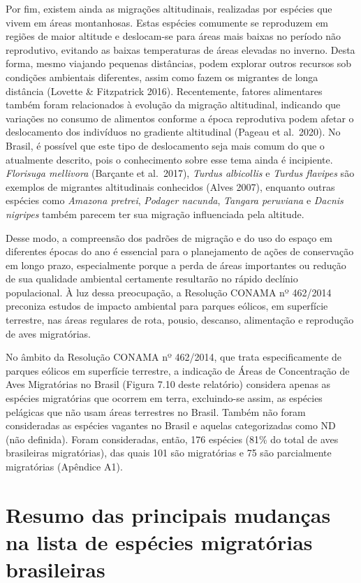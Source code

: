 \documentclass[
  oneside]{scrbook}
\begin{document}
Por fim, existem ainda as migrações altitudinais, realizadas por espécies que vivem em áreas montanhosas. Estas espécies comumente se reproduzem em regiões de maior altitude e deslocam-se para áreas mais baixas no período não reprodutivo, evitando as baixas temperaturas de áreas elevadas no inverno. Desta forma, mesmo viajando pequenas distâncias, podem explorar outros recursos sob condições ambientais diferentes, assim como fazem os migrantes de longa distância (Lovette \& Fitzpatrick 2016). Recentemente, fatores alimentares também foram relacionados à evolução da migração altitudinal, indicando que variações no consumo de alimentos conforme a época reprodutiva podem afetar o deslocamento dos indivíduos no gradiente altitudinal (Pageau et al.~2020). No Brasil, é possível que este tipo de deslocamento seja mais comum do que o atualmente descrito, pois o conhecimento sobre esse tema ainda é incipiente. \emph{Florisuga mellivora} (Barçante et al.~2017), \emph{Turdus albicollis} e \emph{Turdus flavipes} são exemplos de migrantes altitudinais conhecidos (Alves 2007), enquanto outras espécies como \emph{Amazona pretrei}, \emph{Podager nacunda}, \emph{Tangara peruviana} e \emph{Dacnis nigripes} também parecem ter sua migração influenciada pela altitude.

Desse modo, a compreensão dos padrões de migração e do uso do espaço em diferentes épocas do ano é essencial para o planejamento de ações de conservação em longo prazo, especialmente porque a perda de áreas importantes ou redução de sua qualidade ambiental certamente resultarão no rápido declínio populacional. À luz dessa preocupação, a Resolução CONAMA nº 462/2014 preconiza estudos de impacto ambiental para parques eólicos, em superfície terrestre, nas áreas regulares de rota, pousio, descanso, alimentação e reprodução de aves migratórias.

No âmbito da Resolução CONAMA nº 462/2014, que trata especificamente de parques eólicos em superfície terrestre, a indicação de Áreas de Concentração de Aves Migratórias no Brasil (Figura 7.10 deste relatório) considera apenas as espécies migratórias que ocorrem em terra, excluindo-se assim, as espécies pelágicas que não usam áreas terrestres no Brasil. Também não foram consideradas as espécies vagantes no Brasil e aquelas categorizadas como ND (não definida). Foram consideradas, então, 176 espécies (81\% do total de aves brasileiras migratórias), das quais 101 são migratórias e 75 são parcialmente migratórias (Apêndice A1).

\hypertarget{resumo-das-principais-mudanuxe7as-na-lista-de-espuxe9cies-migratuxf3rias-brasileiras}{%
\section{Resumo das principais mudanças na lista de espécies migratórias brasileiras}\label{resumo-das-principais-mudanuxe7as-na-lista-de-espuxe9cies-migratuxf3rias-brasileiras}}
\end{document}
